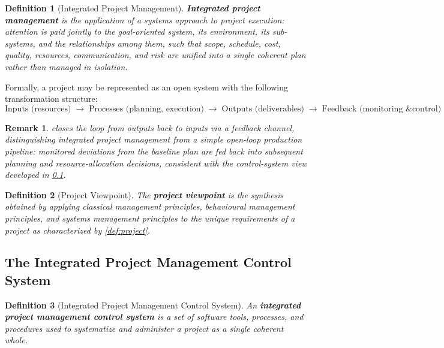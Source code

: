 \documentclass[12pt, a4paper]{report}
\theoremstyle{engnotes}
\newtheorem{defn}{Definition}[section]
\newtheorem{remark}{Remark}[section]
\begin{document}
\begin{defn}[Integrated Project Management]\label{def:integrated_project_management}
    \textbf{Integrated project management} is the application of a systems approach to project execution: attention is paid jointly to the goal-oriented system, its environment, its sub-systems, and the relationships among them, such that scope, schedule, cost, quality, resources, communication, and risk are unified into a single coherent plan rather than managed in isolation.
\end{defn}

Formally, a project may be represented as an open system with the following transformation structure:
\begin{equation}
    \text{Inputs (resources)} \;\longrightarrow\; \text{Processes (planning, execution)} \;\longrightarrow\; \text{Outputs (deliverables)} \;\longrightarrow\; \text{Feedback (monitoring \& control)}
    \label{eq:project_system_transformation}
\end{equation}

\begin{remark}
     closes the loop from outputs back to inputs via a feedback channel, distinguishing integrated project management from a simple open-loop production pipeline: monitored deviations from the baseline plan are fed back into subsequent planning and resource-allocation decisions, consistent with the control-system view developed in \cref{subsec:control_system}.
\end{remark}

\begin{defn}[Project Viewpoint]\label{def:project_viewpoint}
    The \textbf{project viewpoint} is the synthesis obtained by applying classical management principles, behavioural management principles, and systems management principles to the unique requirements of a project as characterized by \cref{def:project}.
\end{defn}

\subsection{The Integrated Project Management Control System}
\label{subsec:control_system}

\begin{defn}[Integrated Project Management Control System]\label{def:control_system}
    An \textbf{integrated project management control system} is a set of software tools, processes, and procedures used to systematize and administer a project as a single coherent whole.
\end{defn}
\end{document}
